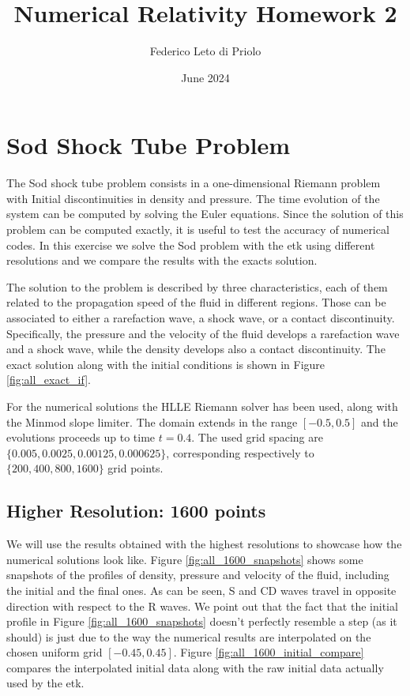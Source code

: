 \documentclass[11pt, a4paper]{article}
\title{Numerical Relativity Homework 2}
\author{Federico Leto di Priolo}
\date{June 2024}
\begin{document}
\maketitle

\section{Sod Shock Tube Problem}

The Sod shock tube problem consists in a one-dimensional Riemann
problem with Initial discontinuities in density and pressure. The time
evolution of the system can be computed by solving the Euler equations.
Since the solution of this problem can be computed exactly, it is useful
to test the accuracy of numerical codes. In this exercise we solve the
Sod problem with the \acrfull{etk} using different resolutions and we
compare the results with the exacts solution.

The solution to the problem is described by three characteristics, each
of them related to the propagation speed of the fluid in different
regions. Those can be associated to either a rarefaction wave, a shock
wave, or a contact discontinuity. Specifically, the pressure and the
velocity of the fluid develops a rarefaction wave and a shock wave, while
the density develops also a contact discontinuity. The exact solution
along with the initial conditions is shown in Figure
\ref{fig:all_exact_if}.

For the numerical solutions the HLLE Riemann solver has been used, along
with the Minmod slope limiter. The domain extends in the range
\([-0.5, 0.5]\) and the evolutions proceeds up to time \(t = 0.4\).
The used grid spacing are \(\{0.005, 0.0025, 0.00125, 0.000625\}\),
corresponding respectively to \(\{200, 400, 800, 1600\}\) grid points.

\subsection{Higher Resolution: 1600 points}

We will use the results obtained with the highest resolutions to showcase
how the numerical solutions look like. Figure
\ref{fig:all_1600_snapshots} shows some snapshots of the profiles of
density, pressure and velocity of the fluid, including the initial and
the final ones. As can be seen, S and CD waves travel in opposite
direction with respect to the R waves. We point out that the fact that
the initial profile in Figure \ref{fig:all_1600_snapshots} doesn't
perfectly resemble a step (as it should) is just due to the way the
numerical results are interpolated on the chosen uniform grid
\([-0.45, 0.45]\). Figure \ref{fig:all_1600_initial_compare} compares
the interpolated initial data along with the raw initial data actually
used by the \acrshort{etk}.
\end{document}
